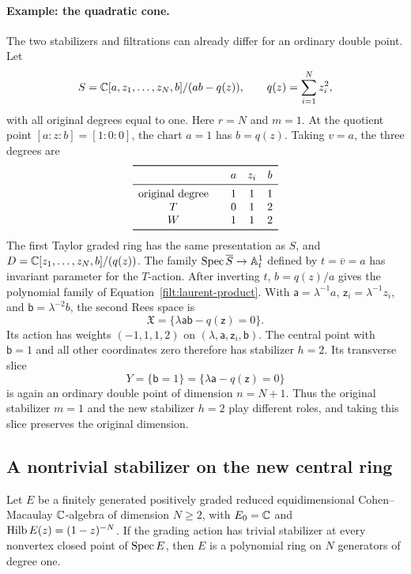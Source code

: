 \paragraph{Example: the quadratic cone.}
The two stabilizers and filtrations can already differ for an ordinary
double point.  Let
\[
 S=\mathbb C[a,z_1,\ldots,z_N,b]/(ab-q(z)),
 \qquad q(z)=\sum_{i=1}^N z_i^2,
\]
with all original degrees equal to one.  Here \(r=N\) and \(m=1\).
At the quotient point \([a:z:b]=[1:0:0]\), the chart \(a=1\)
has \(b=q(z)\).  Taking \(v=a\), the three degrees are
\[
\begin{array}{c@{\qquad}ccc}
 \toprule
 &a&z_i&b\\
 \midrule
 \text{original degree}&1&1&1\\
 T&0&1&2\\
 W&1&1&2\\
 \bottomrule
\end{array}
\]
The first Taylor graded ring has the same presentation as \(S\), and
\(D=\mathbb C[z_1,\ldots,z_N,b]/(q(z))\).  The family
\(\operatorname{Spec}\overline S\to\mathbb A^1_t\) defined by \(t=\overline v=a\)
has invariant parameter for the \(T\)-action.  After inverting \(t\),
\(b=q(z)/a\) gives the polynomial family of
Equation~\eqref{filt:laurent-product}.  With
\(\mathsf a=\lambda^{-1}a\), \(\mathsf z_i=\lambda^{-1}z_i\),
and \(\mathsf b=\lambda^{-2}b\), the second Rees space is
\[
 \mathfrak X=
 \{\lambda\mathsf a\mathsf b-q(\mathsf z)=0\}.
\]
Its action has weights \((-1,1,1,2)\) on
\((\lambda,\mathsf a,\mathsf z_i,\mathsf b)\).
The central point with \(\mathsf b=1\) and all other coordinates zero
therefore has stabilizer \(h=2\).  Its transverse slice
\[
 Y=\{\mathsf b=1\}
   =\{\lambda\mathsf a-q(\mathsf z)=0\}
\]
is again an ordinary double point of dimension \(n=N+1\).
Thus the original stabilizer \(m=1\) and the new stabilizer \(h=2\)
play different roles, and taking this slice preserves the original
dimension.

\subsection{A nontrivial stabilizer on the new central ring}

\begin{lemma}\label{filt:free-grading}
Let $E$ be a finitely generated positively graded reduced
equidimensional Cohen--Macaulay $\mathbb C$-algebra of dimension $N\geq2$,
with $E_0=\mathbb C$ and $\operatorname{Hilb} E(z)=(1-z)^{-N}$.  If the grading action has
trivial stabilizer at every nonvertex closed point of $\operatorname{Spec} E$, then
$E$ is a polynomial ring on $N$ generators of degree one.
\end{lemma}

